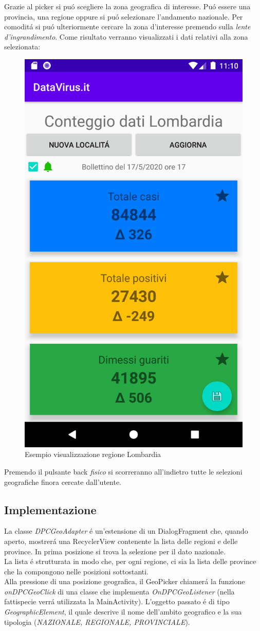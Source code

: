 \documentclass{article}
\begin{document}
    Grazie al picker si puó scegliere la zona geografica di interesse. Puó essere una provincia, una regione oppure si puó selezionare l'andamento nazionale.
    Per comoditá si puó ulteriormente cercare la zona d'interesse premendo sulla \emph{lente d'ingrandimento}.
    Come risultato verranno visualizzati i dati relativi alla zona selezionata:

    \begin{figure}[h]
        \centering
        \includegraphics[width=.5\linewidth]{lombardia.png}
        \caption{Esempio visualizzazione regione Lombardia}
        \label{fig3}
    \end{figure}

    Premendo il pulsante back \emph{fisico} si scorreranno all'indietro tutte le selezioni geografiche finora cercate dall'utente.

    \subsection{Implementazione}

    La classe \emph{DPCGeoAdapter} é un'estensione di un DialogFragment che, quando aperto, mostrerá una RecyclerView contenente la lista delle regioni e delle province. In prima posizione si trova la selezione per il dato nazionale.
    \\
    La lista é strutturata in modo che, per ogni regione, ci sia la lista delle province che la compongono nelle posizioni sottostanti. 
    \\
    Alla pressione di una posizione geografica, il GeoPicker chiamerá la funzione \emph{onDPCGeoClick} di una classe che implementa \emph{OnDPCGeoListener} (nella fattispecie verrá utilizzata la MainActivity).
    L'oggetto passato é di tipo \emph{GeographicElement}, il quale descrive il nome dell'ambito geografico e la sua tipologia (\emph{NAZIONALE, REGIONALE, PROVINCIALE}).
\end{document}
